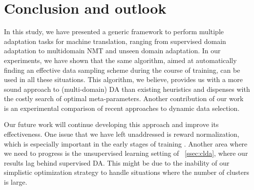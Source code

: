 \documentclass[11pt]{article}
\newcommand{\fyDone}[1]{\done[FY]\Todo[FY:]{\textcolor{orange}{#1}}}
\begin{document}
\section{Conclusion and outlook \label{sec:conclusion}}
\fyDone{Write conclusion}
In this study, we have presented a generic framework to perform multiple adaptation tasks for machine translation, ranging from supervised domain adaptation to multidomain NMT and unseen domain adaptation. In our experiments, we have shown that the same algorithm, aimed at automatically finding an effective data sampling scheme during the course of training, can be used in all these situations. This algorithm, we believe, provides us with a more sound approach to (multi-domain) DA than existing heuristics and dispenses with the costly search of optimal meta-parameters. Another contribution of our work is an experimental comparison of recent approaches to dynamic data selection.

Our future work will continue developing this approach and improve its effectiveness. One issue that we have left unaddressed is reward normalization, which is especially important in the early stages of training \cite{Kumar19reinforcement}. Another area where we need to progress is the unsupervised learning setting of \textsection~\ref{ssec:clda}, where our results lag behind supervised DA. This might be due to the inability of our simplistic optimization strategy to handle situations where the number of clusters is large.




%
\end{document}
